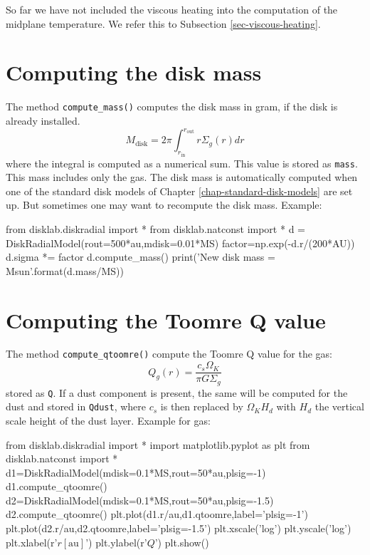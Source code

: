 \documentclass{book}
\newcommand{\code}[1]{{\small\tt #1}}
\begin{document}
So far we have not included the viscous heating into the computation of the midplane
temperature. We refer this to Subsection \ref{sec-viscous-heating}.

\section{Computing the disk mass}
The method \code{compute\_mass()} computes the disk mass in gram,
if the disk is already installed.
\begin{equation}
M_{\mathrm{disk}} = 2\pi \int_{r_{\mathrm{in}}}^{r_{\mathrm{out}}} r \Sigma_g(r) dr
\end{equation}
where the integral is computed as a numerical sum. This value is stored as
\code{mass}. This mass includes only the gas. The disk
mass is automatically computed when one of the standard disk models of
Chapter \ref{chap-standard-disk-models} are set up. But sometimes one
may want to recompute the disk mass. Example:
\begin{codebox}
from disklab.diskradial import *
from disklab.natconst import *
d = DiskRadialModel(rout=500*au,mdisk=0.01*MS)
factor=np.exp(-d.r/(200*AU))
d.sigma *= factor
d.compute_mass()
print('New disk mass = {} Msun'.format(d.mass/MS))
\end{codebox}

\section{Computing the Toomre Q value}
\label{sec-toomre-q}
%
The method \code{compute\_qtoomre()} compute the Toomre Q value for the
gas:
\begin{equation}
Q_g(r) = \frac{c_s\Omega_K}{\pi G \Sigma_g}
\end{equation}
stored as \code{Q}. If a dust component is present, the same will be computed
for the dust and stored in \code{Qdust}, where $c_s$ is then replaced by
$\Omega_K H_d$ with $H_d$ the vertical scale height of the dust layer. Example
for gas:
\begin{codebox}
from disklab.diskradial import *
import matplotlib.pyplot as plt
from disklab.natconst import *
d1=DiskRadialModel(mdisk=0.1*MS,rout=50*au,plsig=-1)
d1.compute_qtoomre()
d2=DiskRadialModel(mdisk=0.1*MS,rout=50*au,plsig=-1.5)
d2.compute_qtoomre()
plt.plot(d1.r/au,d1.qtoomre,label='plsig=-1')
plt.plot(d2.r/au,d2.qtoomre,label='plsig=-1.5')
plt.xscale('log')
plt.yscale('log')
plt.xlabel(r'$r [\mathrm{au}]$')
plt.ylabel(r'$Q$')
plt.show()
\end{codebox}
\end{document}

